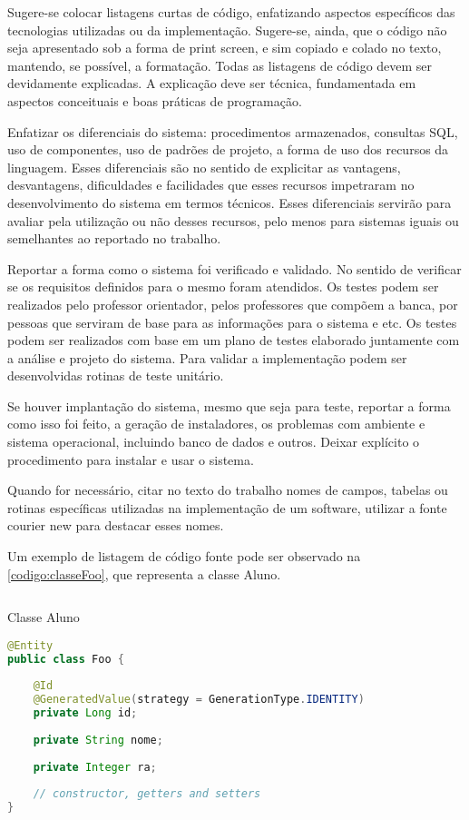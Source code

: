 Sugere-se colocar listagens curtas de código, enfatizando aspectos específicos das tecnologias utilizadas ou da implementação. Sugere-se, ainda, que o código não seja apresentado sob a forma de print screen, e sim copiado e colado no texto, mantendo, se possível, a formatação. Todas as listagens de código devem ser devidamente explicadas. A explicação deve ser técnica, fundamentada em aspectos conceituais e boas práticas de programação.

Enfatizar os diferenciais do sistema: procedimentos armazenados, consultas SQL, uso de componentes, uso de padrões de projeto, a forma de uso dos recursos da linguagem. Esses diferenciais são no sentido de explicitar as vantagens, desvantagens, dificuldades e facilidades que esses recursos impetraram no desenvolvimento do sistema em termos técnicos. Esses diferenciais servirão para avaliar pela utilização ou não desses recursos, pelo menos para sistemas iguais ou semelhantes ao reportado no trabalho.

Reportar a forma como o sistema foi verificado e validado. No sentido de verificar se os requisitos definidos para o mesmo foram atendidos. Os testes podem ser realizados pelo professor orientador, pelos professores que compõem a banca, por pessoas que serviram de base para as informações para o sistema e etc. Os testes podem ser realizados com base em um plano de testes elaborado juntamente com a análise e projeto do sistema. Para validar a implementação podem ser desenvolvidas rotinas de teste unitário.

Se houver implantação do sistema, mesmo que seja para teste, reportar a forma como isso foi feito, a geração de instaladores, os problemas com ambiente e sistema operacional, incluindo banco de dados e outros. Deixar explícito o procedimento para instalar e usar o sistema.

Quando for necessário, citar no texto do trabalho nomes de campos, tabelas ou rotinas específicas utilizadas na implementação de um software, utilizar a fonte courier new para destacar esses nomes.

Um exemplo de listagem de código fonte pode ser observado na \autoref{codigo:classeFoo}, que representa a classe Aluno.

\begin{sourcecode}[htb]
  \caption{\label{codigo:classeFoo}Classe Aluno}
  \begin{lstlisting}[frame=single, language=Java]
@Entity
public class Foo {
 
    @Id
    @GeneratedValue(strategy = GenerationType.IDENTITY)
    private Long id;
 
    private String nome;
    
    private Integer ra;
     
    // constructor, getters and setters
}
\end{lstlisting}
  \fonte{}
\end{sourcecode}

